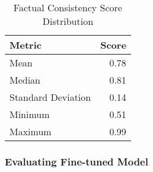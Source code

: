 \begin{table}[h]
\centering
\caption{Factual Consistency Score Distribution}
\begin{tabular}{lr}
\hline
Metric & Score \\
\hline
Mean & 0.78 \\
Median & 0.81 \\
Standard Deviation & 0.14 \\
Minimum & 0.51 \\
Maximum & 0.99 \\
\hline
\end{tabular}
\label{tab:factual-consistency-scores}
\end{table}

\subsubsection{Evaluating Fine-tuned Model}

